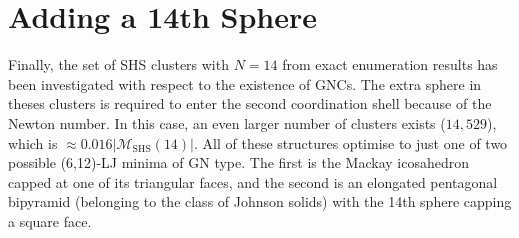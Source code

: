 \section{Adding a 14th Sphere}
\label{sec:addinga14thsphere}

Finally, the set of \ac{SHS} clusters with $N=14$ from exact enumeration
results\autocite{Holmes-Cerfon_EnumeratingRigidSphere_2016} has been
investigated with respect to the existence of \acp{GNC}. The extra sphere in
theses clusters is required to enter the second coordination shell because of
the Newton number. In this case, an even larger number of clusters exists
($14,529$), which is $\approx 0.016|\mathcal{M}_\mathrm{SHS}(14)|$. All of these
structures optimise to just one of two possible (6,12)-LJ minima of \ac{GN}
type. The first is the Mackay icosahedron capped at one of its triangular faces,
and the second is an elongated pentagonal bipyramid (belonging to the class of
Johnson solids) with the 14th sphere capping a square face.

